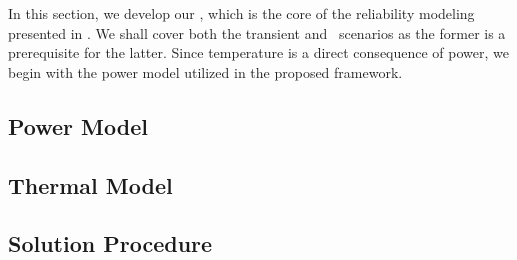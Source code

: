 In this section, we develop our \ta, which is the core of the reliability modeling presented in .
We shall cover both the transient and \dss\ scenarios as the former is a prerequisite for the latter.
Since temperature is a direct consequence of power, we begin with the power model utilized in the proposed framework.

\subsection{Power Model} 


\subsection{Thermal Model} 


\subsection{Solution Procedure} 


